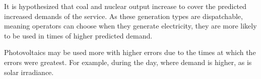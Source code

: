 It is hypothesized that coal and nuclear output increase to cover the predicted increased demands of the service. As these generation types are dispatchable, meaning operators can choose when they generate electricity, they are more likely to be used in times of higher predicted demand.

Photovoltaics may be used more with higher errors due to the times at which the errors were greatest. For example, during the day, where demand is higher, as is solar irradiance.


    
    

    
%
%
%
%
%
%



